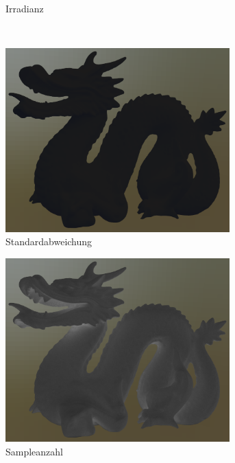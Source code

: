 \begin{figure}[h]
\begin{subfigure}[t]{0.5\textwidth}
				\caption{Irradianz}
			\end{subfigure}
			\medskip \\
			\begin{subfigure}[t]{0.5\textwidth}
				\center
				\includegraphics[width=0.95\textwidth]{pic/irr_est-ra-dragon-err.png}
				\caption{Standardabweichung}
			\end{subfigure}
			\begin{subfigure}[t]{0.5\textwidth}
				\center
				\includegraphics[width=0.95\textwidth]{pic/irr_est-ra-dragon-scount.png}
				\caption{Sampleanzahl}
			\end{subfigure}
			\caption{}
			\label{fig:irr-est-ra-dragon}
		\end{figure}

